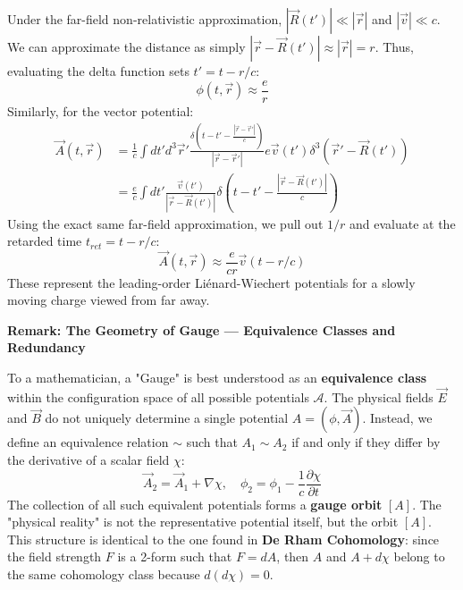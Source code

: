 \begin{solution}
Under the far-field non-relativistic approximation, $|\vec{R}(t')| \ll |\vec{r}|$ and $|\vec{v}| \ll c$. We can approximate the distance as simply $|\vec{r}-\vec{R}(t')| \approx |\vec{r}| = r$.
Thus, evaluating the delta function sets $t' = t - r/c$:
\begin{equation*}
    \phi(t, \vec{r}) \approx \frac{e}{r}
\end{equation*}
Similarly, for the vector potential:
\begin{align*}
    \vec{A}(t, \vec{r}) &= \frac{1}{c} \int dt' d^3\vec{r}' \frac{\delta\left(t-t' - \frac{|\vec{r}-\vec{r}'|}{c}\right)}{|\vec{r}-\vec{r}'|} e \vec{v}(t') \delta^3(\vec{r}' - \vec{R}(t')) \\
    &= \frac{e}{c} \int dt' \frac{\vec{v}(t')}{|\vec{r}-\vec{R}(t')|} \delta\left(t-t' - \frac{|\vec{r}-\vec{R}(t')|}{c}\right)
\end{align*}
Using the exact same far-field approximation, we pull out $1/r$ and evaluate at the retarded time $t_{ret} = t - r/c$:
\begin{equation*}
    \vec{A}(t, \vec{r}) \approx \frac{e}{cr} \vec{v}(t - r/c)
\end{equation*}
These represent the leading-order Liénard-Wiechert potentials for a slowly moving charge viewed from far away.
\end{solution}

\textbf{Remark: The Geometry of Gauge --- Equivalence Classes and Redundancy}

To a mathematician, a "Gauge" is best understood as an \textbf{equivalence class} within the configuration space of all possible potentials $\mathcal{A}$. The physical fields $\vec{E}$ and $\vec{B}$ do not uniquely determine a single potential $A = (\phi, \vec{A})$. Instead, we define an equivalence relation $\sim$ such that $A_1 \sim A_2$ if and only if they differ by the derivative of a scalar field $\chi$:
\begin{equation*}
    \vec{A}_2 = \vec{A}_1 + \nabla \chi, \quad \phi_2 = \phi_1 - \frac{1}{c} \frac{\partial \chi}{\partial t}
\end{equation*}
The collection of all such equivalent potentials forms a \textbf{gauge orbit} $[A]$. The "physical reality" is not the representative potential itself, but the orbit $[A]$. This structure is identical to the one found in \textbf{De Rham Cohomology}: since the field strength $F$ is a 2-form such that $F = dA$, then $A$ and $A+d\chi$ belong to the same cohomology class because $d(d\chi) = 0$.

